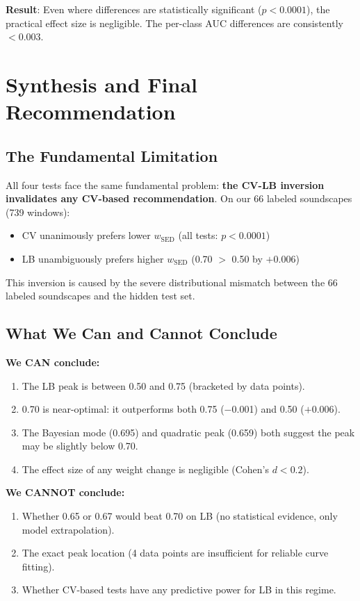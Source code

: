 \documentclass[a4paper,11pt]{article}
\begin{document}
\textbf{Result}: Even where differences are statistically significant ($p < 0.0001$), the practical effect size is negligible. The per-class AUC differences are consistently $< 0.003$.

\section{Synthesis and Final Recommendation}

\subsection{The Fundamental Limitation}

All four tests face the same fundamental problem: \textbf{the CV-LB inversion invalidates any CV-based recommendation}. On our 66 labeled soundscapes (739 windows):
\begin{itemize}
\item CV unanimously prefers lower $w_\text{SED}$ (all tests: $p < 0.0001$)
\item LB unambiguously prefers higher $w_\text{SED}$ (0.70 $>$ 0.50 by $+$0.006)
\end{itemize}
This inversion is caused by the severe distributional mismatch between the 66 labeled soundscapes and the hidden test set.

\subsection{What We Can and Cannot Conclude}

\textbf{We CAN conclude:}
\begin{enumerate}
\item The LB peak is between 0.50 and 0.75 (bracketed by data points).
\item 0.70 is near-optimal: it outperforms both 0.75 ($-$0.001) and 0.50 ($+$0.006).
\item The Bayesian mode (0.695) and quadratic peak (0.659) both suggest the peak may be slightly below 0.70.
\item The effect size of any weight change is negligible (Cohen's $d < 0.2$).
\end{enumerate}

\textbf{We CANNOT conclude:}
\begin{enumerate}
\item Whether 0.65 or 0.67 would beat 0.70 on LB (no statistical evidence, only model extrapolation).
\item The exact peak location (4 data points are insufficient for reliable curve fitting).
\item Whether CV-based tests have any predictive power for LB in this regime.
\end{enumerate}
\end{document}
